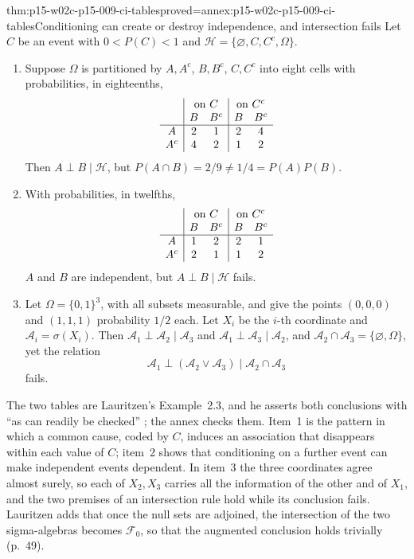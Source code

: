 \begin{hbtheorem}{thm:p15-w02c-p15-009-ci-tables}{proved=annex:p15-w02c-p15-009-ci-tables}{Conditioning can create or destroy independence, and intersection fails}
Let \(C\) be an event with \(0<P(C)<1\) and
\(\mathcal H=\{\varnothing,C,C^c,\Omega\}\).
\begin{enumerate}
\item Suppose \(\Omega\) is partitioned by \(A,A^c\), \(B,B^c\), \(C,C^c\)
      into eight cells with probabilities, in eighteenths,
      \[
      \begin{array}{c|cc|cc}
        & \multicolumn{2}{c|}{\text{on }C} & \multicolumn{2}{c}{\text{on }C^c}\\
        & B & B^c & B & B^c\\\hline
       A & 2 & 1 & 2 & 4\\
       A^c & 4 & 2 & 1 & 2
      \end{array}
      \]
      Then \(A\perp B\mid\mathcal H\), but \(P(A\cap B)=2/9\ne1/4=P(A)P(B)\).
\item With probabilities, in twelfths,
      \[
      \begin{array}{c|cc|cc}
        & \multicolumn{2}{c|}{\text{on }C} & \multicolumn{2}{c}{\text{on }C^c}\\
        & B & B^c & B & B^c\\\hline
       A & 1 & 2 & 2 & 1\\
       A^c & 2 & 1 & 1 & 2
      \end{array}
      \]
      \(A\) and \(B\) are independent, but \(A\perp B\mid\mathcal H\) fails.
\item Let \(\Omega=\{0,1\}^3\), with all subsets measurable, and give the
      points \((0,0,0)\) and \((1,1,1)\) probability \(1/2\) each. Let \(X_i\) be the \(i\)-th
      coordinate and \(\mathcal A_i=\sigma(X_i)\). Then
      \(\mathcal A_1\perp\mathcal A_2\mid\mathcal A_3\) and
      \(\mathcal A_1\perp\mathcal A_3\mid\mathcal A_2\), and
      \(\mathcal A_2\cap\mathcal A_3=\{\varnothing,\Omega\}\), yet the
      relation
      \[
       \mathcal A_1\perp(\mathcal A_2\vee\mathcal A_3)\mid\mathcal A_2\cap\mathcal A_3
      \]
      fails.
\end{enumerate}
\end{hbtheorem}

The two tables are Lauritzen's Example~2.3, and he asserts both
conclusions with ``as can readily be checked''
\cite[p.~41]{Lauritzen2019GraphicalLectures2020}; the annex checks them.
Item~1 is the pattern in which a common cause, coded by \(C\), induces an
association that disappears within each value of \(C\); item~2 shows that
conditioning on a further event can make independent events dependent.
In item~3 the three coordinates agree almost surely, so each of
\(X_2,X_3\) carries all the information of the other and of \(X_1\), and
the two premises of an intersection rule hold while its conclusion fails.
Lauritzen adds that once the null sets are adjoined, the intersection of
the two sigma-algebras becomes \(\mathcal F_0\), so that the augmented
conclusion holds trivially (p.~49).
